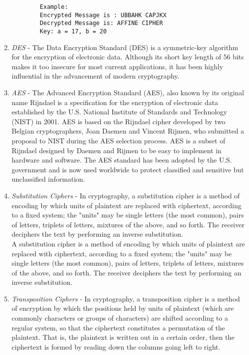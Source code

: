 \documentclass[11pt]{article}
\begin{document}
\begin{enumerate}
	      \begin{verbatim}
		Example:
		Encrypted Message is : UBBAHK CAPJKX
		Decrypted Message is: AFFINE CIPHER
		Key: a = 17, b = 20
	\end{verbatim}

	\item \textit{DES} - The Data Encryption Standard (DES) is a symmetric-key algorithm for the encryption of electronic data. Although its short key length of 56 bits makes it too insecure for most current applications, it has been highly influential in the advancement of modern cryptography.
	\item \textit{AES} - The Advanced Encryption Standard (AES), also known by its original name Rijndael is a specification for the encryption of electronic data established by the U.S. National Institute of Standards and Technology (NIST) in 2001. AES is based on the Rijndael cipher developed by two Belgian cryptographers, Joan Daemen and Vincent Rijmen, who submitted a proposal to NIST during the AES selection process. AES is a subset of Rijndael designed by Daemen and Rijmen to be easy to implement in hardware and software. The AES standard has been adopted by the U.S. government and is now used worldwide to protect classified and sensitive but unclassified information.
	\item \textit{Substitution Ciphers} - In cryptography, a substitution cipher is a method of encoding by which units of plaintext are replaced with ciphertext, according to a fixed system; the "units" may be single letters (the most common), pairs of letters, triplets of letters, mixtures of the above, and so forth. The receiver deciphers the text by performing an inverse substitution.\\

	      A substitution cipher is a method of encoding by which units of plaintext are replaced with ciphertext, according to a fixed system; the "units" may be single letters (the most common), pairs of letters, triplets of letters, mixtures of the above, and so forth. The receiver deciphers the text by performing an inverse substitution.

	\item \textit{Transposition Ciphers} - In cryptography, a transposition cipher is a method of encryption by which the positions held by units of plaintext (which are commonly characters or groups of characters) are shifted according to a regular system, so that the ciphertext constitutes a permutation of the plaintext. That is, the plaintext is written out in a certain order, then the ciphertext is formed by reading down the columns going left to right.\\

\end{enumerate}
\end{document}
